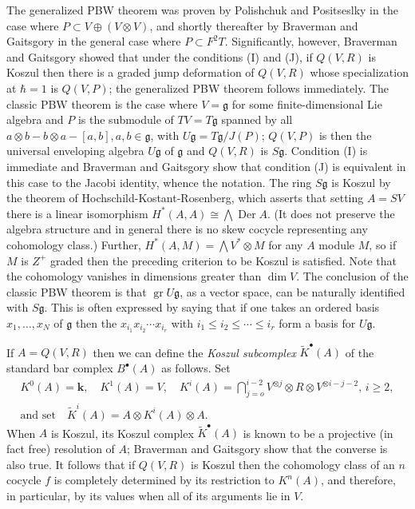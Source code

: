 \documentclass{amsart}
\begin{document}
The generalized PBW theorem
was proven by Polishchuk and Positseslky \cite{PP:Quadratic} in the case where $P \subset V \oplus (V\otimes V)$, and shortly thereafter by Braverman and Gaitsgory \cite{BravermanGaitsgory:PBW} in the general case where $P \subset F^2T$. Significantly, however,  Braverman and Gaitsgory showed that under the conditions (I) and (J), if $Q(V, R)$ is Koszul then there is a graded jump deformation of $Q(V,R)$ whose specialization at $\hbar = 1$ is $Q(V,P)$; the generalized PBW theorem follows immediately.  The classic PBW theorem is the case where $V = {\mathfrak{g}}$ for some finite-dimensional Lie algebra and $P$ is the submodule of $TV = T{\mathfrak{g}}$ spanned by all $a\otimes b -b \otimes a - [a,b], a,b \in {\mathfrak{g}}$, with  $U{\mathfrak{g}} = T{\mathfrak{g}}/J(P)$; $Q(V,P)$ is then the universal enveloping algebra $U{\mathfrak{g}}$ of ${\mathfrak{g}}$ and $Q(V,R)$ is $S{\mathfrak{g}}$.   Condition (I) is immediate and Braverman and Gaitsgory show that condition (J) is equivalent in this case to the Jacobi identity, whence the notation. The ring $S{\mathfrak{g}}$ is Koszul by the theorem of Hochschild-Kostant-Rosenberg, which asserts that setting $A = SV$ there is a linear isomorphism $H^*(A, A)\cong \bigwedge \operatorname{Der} A$. (It does not preserve the algebra structure and in general there is no skew cocycle representing any cohomology class.) Further,  $H^*(A,M) = \bigwedge V^*\otimes M$ for any $A$ module $M$, so if $M$ is $Z^+$ graded then the preceding criterion to be Koszul is satisfied. Note that the cohomology vanishes in dimensions greater than $\dim V$. The conclusion of the classic PBW theorem is that ${\operatorname{gr}} U{\mathfrak{g}}$, as a vector space, can be naturally identified with $S{\mathfrak{g}}$. This is often expressed by saying that  if one takes an ordered basis $x_1,\dots, x_N$ of ${\mathfrak{g}}$ then the $x_{i_1}x_{i_2}\cdots x_{i_r}$ with $i_1 \le i_2 \le \cdots \le  i_r$  form a basis for $U{\mathfrak{g}}$.
 
If $A = Q(V,R)$ then we can define the \emph{Koszul subcomplex} $\tilde K^{\bullet}(A)$ of the standard bar complex $B^{\bullet}(A)$ as follows. Set
\begin{multline}
K^0(A) = {\ensuremath{\mathbf{k}}}, \quad K^1(A) = V,\quad K^i(A) = \bigcap_{j=o}^{i-2}
V^{\otimes j} \otimes R \otimes V^{\otimes i-j-2}, \, i\ge2,\\ \text{and set} \quad \tilde K^i(A) = A\otimes K^i(A)\otimes A.
\end{multline}
When $A$ is Koszul,  its Koszul complex  $\tilde K^{\bullet}(A)$ is known to be a projective (in fact free) resolution of $A$; Braverman and Gaitsgory \cite{BravermanGaitsgory:PBW} show that the converse is also true.  It follows that if $Q(V,R)$ is Koszul then the cohomology class of an $n$ cocycle $f$ is completely determined by its restriction to $K^n(A)$, and therefore, in particular, by its values when all of its arguments lie in $V$.
\end{document}
